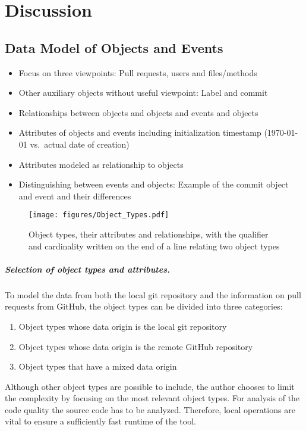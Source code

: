 \chapter{Discussion}
\label{chap:discussion}

\section{Data Model of Objects and Events}
\begin{itemize}
	\item Focus on three viewpoints: Pull requests, users and files/methods
	\item Other auxiliary objects without useful viewpoint: Label and commit
	\item Relationships between objects and objects and events and objects
	\item Attributes of objects and events including initialization timestamp (1970-01-01 vs.\ actual date of creation)
	\item Attributes modeled as relationship to objects
	\item Distinguishing between events and objects: Example of the commit object and event and their differences
\end{itemize}

\begin{figure}[h]
	\centering
	\texttt{[image: figures/Object\_Types.pdf]}
	\caption{Object types, their attributes and relationships, with the qualifier and cardinality  written on the end of a line relating two object types}
\end{figure}

\paragraph{Selection of object types and attributes.} To model the data from both the local git repository and the information on pull requests from GitHub, the object types can be divided into three categories:

\begin{enumerate}
	\item Object types whose data origin is the local git repository
	\item Object types whose data origin is the remote GitHub repository
	\item Object types that have a mixed data origin
\end{enumerate}

Although other object types are possible to include, the author chooses to limit the complexity by focusing on the most relevant object types. For analysis of the code quality the source code has to be analyzed. Therefore, local operations are vital to ensure a sufficiently fast runtime of the tool. 

